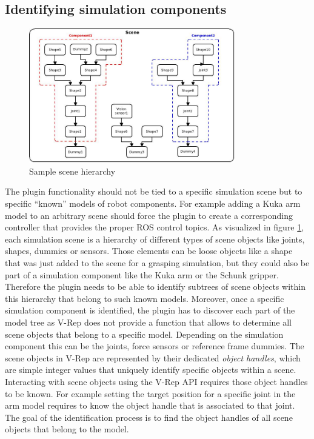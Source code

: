 \subsection{Identifying simulation components}
\label{sec:comp_id}

\begin{figure}[h]
	\centering
  	\includegraphics[width=0.8\textwidth]{images/scene_hierarchy.jpg}
	\caption{Sample scene hierarchy}
	\label{fig:scene_tree}
\end{figure}

The plugin functionality should not be tied to a specific simulation scene but to specific ``known'' models of robot components. For example adding a Kuka arm model to an arbitrary scene should force the plugin to create a corresponding controller that provides the proper ROS control topics. As visualized in figure \ref{fig:scene_tree}, each simulation scene is a hierarchy of different types of scene objects like joints, shapes, dummies or sensors. Those elements can be loose objects like a shape that was just added to the scene for a grasping simulation, but they could also be part of a simulation component like the Kuka arm or the Schunk gripper. Therefore the plugin needs to be able to identify subtrees of scene objects within this hierarchy that belong to such known models. Moreover, once a specific simulation component is identified, the plugin has to discover each part of the model tree as V-Rep does not provide a function that allows to determine all scene objects that belong to a specific model. Depending on the simulation component this can be the joints, force sensors or reference frame dummies. The scene objects in V-Rep are represented by their dedicated \emph{object handles}, which are simple integer values that uniquely identify specific objects within a scene. Interacting with scene objects using the V-Rep API requires those object handles to be known. For example setting the target position for a specific joint in the arm model requires to know the object handle that is associated to that joint. The goal of the identification process is to find the object handles of all scene objects that belong to the model. \\

